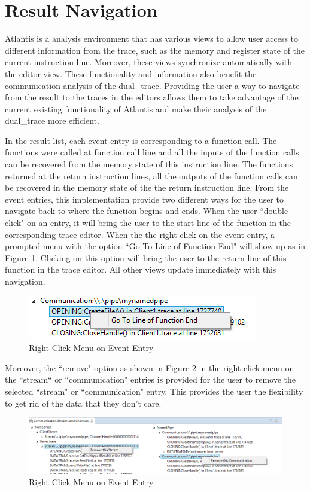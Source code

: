 \section{Result Navigation}
Atlantis is a analysis environment that has various views to allow user access to different information from the trace, such as the memory and register state of the current instruction line. Moreover, these views synchronize automatically with the editor view. These functionality and information also benefit the communication analysis of the dual\_trace. Providing the user a way to navigate from the result to the traces in the editors allows them to take advantage of the current existing functionality of Atlantis and make their analysis of the dual\_trace more efficient.

In the result list, each event entry is corresponding to a function call. The functions were called at function call line and all the inputs of the function calls can be recovered from the memory state of this instruction line. The functions returned at the return instruction lines, all the outputs of the function calls can be recovered in the memory state of the the return instruction line. From the event entries, this implementation provide two different ways for the user to navigate back to where the function begins and ends. When the user ``double click" on an entry, it will bring the user to the start line of the function in the corresponding trace editor. When the the right click on the event entry, a prompted menu with the option ``Go To Line of Function End" will show up as in Figure \ref{gotoend}. Clicking on this option will bring the user to the return line of this function in the trace editor. All other views update immediately with this navigation. 

\begin{figure}[H]
\centerline{\includegraphics{Figures/gotoend}}
 \caption{Right Click Menu on Event Entry}
\label{gotoend}
\end{figure}

Moreover, the ``remove" option as shown in Figure \ref{remove} in the right click menu on the ``stream“ or ``communication" entries is provided for the user to remove the selected ``stream" or ``communication" entry. This provides the user the flexibility to get rid of the data that they don't care.

\begin{figure}[H]
\centerline{\includegraphics[scale=0.7]{Figures/remove}}
 \caption{Right Click Menu on Event Entry}
\label{remove}
\end{figure}


